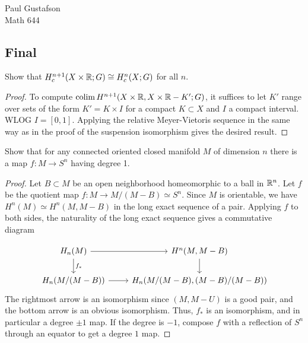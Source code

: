 \documentclass{article}
\begin{document}
\noindent Paul Gustafson\\
\noindent Math 644

\subsection*{Final}
 Show that $H_c^{n+1}(X \times \mathbb{R}; G) \cong H_c^n(X; G)$ for all $n$.
\begin{proof}
To compute $\operatorname{colim} H^{n+1}(X \times \mathbb{R}, X \times \mathbb{R} - K'; G)$, it suffices to let $K'$ range over sets of the form $K' = K \times I$ for a compact $K \subset X$ and $I$ a compact interval. WLOG $I = [0,1]$.  Applying the relative Meyer-Vietoris sequence in the same way as in the proof of the suspension isomorphism gives the desired result.
\end{proof}

 Show that for any connected oriented closed manifold $M$ of dimension $n$ there is a map $f : M \to S^n$ having degree 1.
\begin{proof}
Let $B \subset M$ be an open neighborhood homeomorphic to a ball in $\mathbb{R}^n$.  Let $f$ be the quotient map $f: M \to M/(M-B) \simeq S^n$.
Since $M$ is orientable, we have $H^n(M) \simeq H^n(M, M - B)$ in the long exact sequence of a pair. Applying $f$ to both sides, the 
naturality of the long exact sequence gives a commutative diagram

\[
\begin{tikzcd}
H_n(M) \arrow{r} \arrow{d}{f_*} &  H^n(M, M - B) \arrow{d} \\
H_n(M/(M - B)) \arrow{r} & H_n(M/(M - B), (M - B)/(M - B))
\end{tikzcd}
\]
The rightmost arrow is an isomorphism since $(M, M-U)$ is a good pair, and the bottom arrow is an obvious isomorphism.  Thus, $f_*$ is an isomorphism, and in particular a degree $\pm 1$ map. If the degree is $-1$, compose $f$ with a reflection of $S^n$ through an equator to get a degree $1$ map.
\end{proof}
\end{document}
